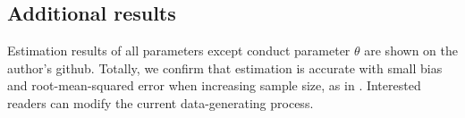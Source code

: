 \documentclass[11pt, a4paper]{article}
\begin{document}


\subsection{Additional results}
Estimation results of all parameters except conduct parameter $\theta$ are shown on the author's github. 
Totally, we confirm that estimation is accurate with small bias and root-mean-squared error when increasing sample size, as in \cite{matsumura2023resolving}.
Interested readers can modify the current data-generating process.


\newpage
\end{document}
